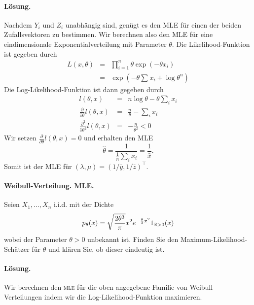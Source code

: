\paragraph*{Lösung.}    Nachdem $Y_i$ und $Z_i$ unabhängig sind, genügt es den 
MLE für einen der beiden Zufallsvektoren zu bestimmen. Wir berechnen also den MLE für eine
eindimensionale Exponentialverteilung mit Parameter $\theta$.
Die Likelihood-Funktion ist gegeben durch
\begin{eqnarray}
	L(x, \theta) &=&  \prod_{i=1}^n \theta \exp\left(  -\theta x_i \right) \\
	&=&  \exp \left(  -\theta \sum_{}^{} x_i + \log \theta^n \right)
\end{eqnarray}
Die Log-Likelihood-Funktion ist dann gegeben durch
\begin{eqnarray}
	l(\theta, x) &=& n \log \theta - \theta \sum_{i}^{} x_i \\
	\frac{\partial}{\partial \theta} l(\theta,x) &=&  \frac{n}{\theta } - \sum_{i}^{} x_i \\
	\frac{\partial^2}{\partial \theta^2} l(\theta,x) &=& - \frac{n}{\theta^2} < 0
\end{eqnarray}
Wir setzen $\frac{\partial}{\partial \theta} l(\theta,x) = 0$ und erhalten den MLE
\begin{equation}
	\hat \theta = \frac{1}{\frac{1}{n} \sum_{i}^{} x_i} = \frac{1}{\bar x}.
\end{equation}
Somit ist der MLE für $\left( \lambda, \mu \right) = \left( 1/\bar y, 1/\bar z \right)^\top$.


\paragraph{Weibull-Verteilung. MLE.} Seien $X_1,\ldots,X_n$ i.i.d.
mit der Dichte 
\begin{equation*}
	p_\theta(x)=
	\sqrt{\frac{2\theta^3}{\pi}} x^2 e^{ - \frac{\theta}{2}x^2} 1_{\mathbb R>0}(x)
\end{equation*}
wobei der Parameter $\theta>0$ unbekannt ist. Finden Sie
den Maximum-Likelihood-Schätzer für $ \theta$ und klären Sie, ob dieser
eindeutig ist.

\paragraph*{Lösung. } Wir berechnen den \textsc{mle} für die oben angegebene Familie von Weibull-Verteilungen
indem wir die Log-Likelihood-Funktion maximieren. 

